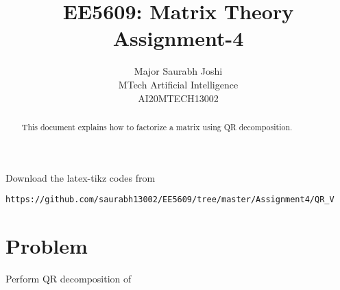 \documentclass[journal,12pt,twocolumn]{IEEEtran}
\begin{document}
\makeatletter
{}
\makeatother
\let\StandardTheFigure\thefigure
\let\vec\mathbf
\renewcommand{\thefigure}{\theproblem}
\def\putbox#1#2#3{\makebox[0in][l]{\makebox[#1][l]{}\raisebox{\baselineskip}[0in][0in]{\raisebox{#2}[0in][0in]{#3}}}}
     \def\rightbox#1{\makebox[0in][r]{#1}}
     \def\centbox#1{\makebox[0in]{#1}}
     \def\topbox#1{\raisebox{-\baselineskip}[0in][0in]{#1}}
     \def\midbox#1{\raisebox{-0.5\baselineskip}[0in][0in]{#1}}
\vspace{3cm}
\title{EE5609: Matrix Theory\\
          Assignment-4\\}
\author{Major Saurabh Joshi\\MTech Artificial Intelligence\\AI20MTECH13002 }
\maketitle
\newpage
\bigskip
\renewcommand{\thefigure}{\theenumi}
\renewcommand{\thetable}{\theenumi}
\begin{abstract}
This  document explains how to factorize a matrix using QR decomposition. 
\end{abstract}
Download the latex-tikz codes from 
%
%
%
\begin{lstlisting}
https://github.com/saurabh13002/EE5609/tree/master/Assignment4/QR_V
\end{lstlisting}
%
\section{Problem}
Perform QR decomposition of  
\end{document}

